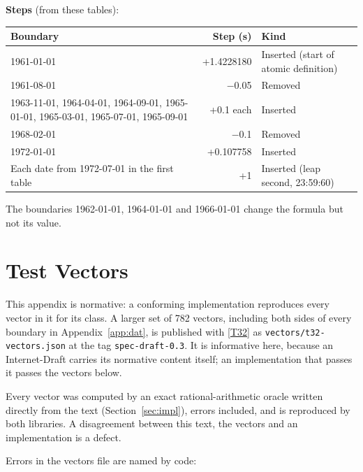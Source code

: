 \documentclass[11pt]{article}
\newcommand{\lit}[1]{\texttt{#1}}
\newcommand{\Sec}[1]{Section~\ref{#1}}
\newcommand{\App}[1]{Appendix~\ref{#1}}
\newcommand{\xref}[1]{[\hyperref[ref:#1]{#1}]}
\begin{document}
\textbf{Steps} (from these tables):

\begin{center}
\begin{tabularx}{\textwidth}{@{}Xrl@{}}
\toprule
Boundary & Step (s) & Kind \\
\midrule
1961-01-01 & +1.4228180 & Inserted (start of atomic definition) \\
1961-08-01 & $-$0.05 & Removed \\
1963-11-01, 1964-04-01, 1964-09-01, 1965-01-01, 1965-03-01, 1965-07-01, 1965-09-01 & +0.1 each & Inserted \\
1968-02-01 & $-$0.1 & Removed \\
1972-01-01 & +0.107758 & Inserted \\
Each date from 1972-07-01 in the first table & +1 & Inserted (leap second, 23:59:60) \\
\bottomrule
\end{tabularx}
\end{center}

The boundaries 1962-01-01, 1964-01-01 and 1966-01-01 change the formula but not
its value.

\section{Test Vectors}\label{app:vectors}

This appendix is normative: a conforming implementation reproduces every
vector in it for its class. A larger set of 782 vectors, including both sides
of every boundary in \App{app:dat}, is published with \xref{T32} as
\lit{vectors/t32-vectors.json} at the tag \lit{spec-draft-0.3}. It is
informative here, because an Internet-Draft carries its normative content
itself; an implementation that passes it passes the vectors below.

Every vector was computed by an exact rational-arithmetic oracle written
directly from the text (\Sec{sec:impl}), errors included, and is reproduced
by both libraries. A disagreement between this text, the vectors and an
implementation is a defect.

Errors in the vectors file are named by code:
\end{document}
